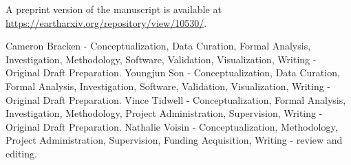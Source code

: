 \documentclass[MLA]{USG} %
\begin{document}
A preprint version of the manuscript is available at \url{https://eartharxiv.org/repository/view/10530/}.



{}

Cameron Bracken - Conceptualization, Data Curation, Formal Analysis, Investigation, Methodology, Software, Validation, Visualization, Writing - Original Draft Preparation. Youngjun Son - Conceptualization, Data Curation, Formal Analysis, Investigation, Software, Validation, Visualization, Writing - Original Draft Preparation. Vince Tidwell - Conceptualization, Formal Analysis, Investigation, Methodology, Project Administration, Supervision, Writing - Original Draft Preparation. Nathalie Voisin - Conceptualization, Methodology, Project Administration, Supervision, Funding Acquisition, Writing - review and editing.









\end{document}
